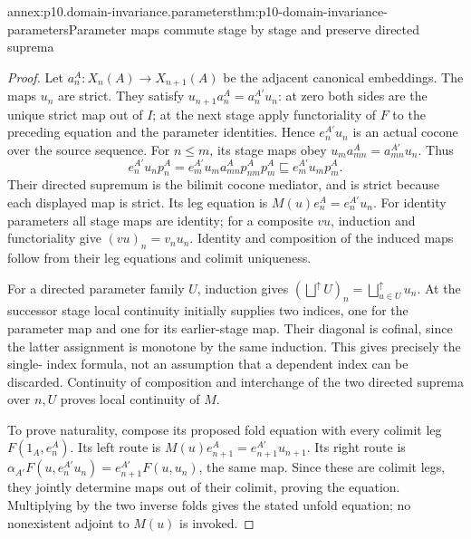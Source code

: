 \begin{annexitem}{annex:p10.domain-invariance.parameters}{thm:p10-domain-invariance-parameters}{Parameter maps commute stage by stage and preserve directed suprema}
\begin{proof}
Let \(a_n^A:X_n(A)\to X_{n+1}(A)\) be the adjacent
canonical embeddings. The maps \(u_n\) are strict. They satisfy
\(u_{n+1}a_n^A=a_n^{A'}u_n\): at zero both sides are
the unique strict map out of \(I\); at the next stage apply
functoriality of \(F\) to the preceding equation and the
parameter identities. Hence \(e_n^{A'}u_n\) is an actual
cocone over the source sequence.
For \(n\le m\), its stage maps obey
\(u_ma_{mn}^A=a_{mn}^{A'}u_n\). Thus
\[
 e_n^{A'}u_np_n^A
 =e_m^{A'}u_ma_{mn}^Ap_{nm}^Ap_m^A
                   \sqsubseteq e_m^{A'}u_mp_m^A.
\]
Their directed supremum is the bilimit cocone mediator, and is
strict because each displayed map is strict. Its leg equation is
\(M(u)e_n^A=e_n^{A'}u_n\).
For identity parameters all stage maps are identity; for a
composite \(vu\), induction and functoriality give
\((vu)_n=v_nu_n\). Identity and composition of the induced
maps follow from their leg equations and colimit uniqueness.

For a directed parameter family \(U\), induction gives
\((\bigsqcup^{\uparrow}U)_n=\bigsqcup_{u\in U}^{\uparrow}u_n\).
At the successor stage local continuity initially supplies two
indices, one for the parameter map and one for its earlier-stage
map. Their diagonal is cofinal, since the latter assignment is
monotone by the same induction. This gives precisely the single-
index formula, not an assumption that a dependent index can be
discarded. Continuity of composition and interchange of the two
directed suprema over \(n,U\) proves local continuity of \(M\).

To prove naturality, compose its proposed fold equation with
every colimit leg \(F(1_A,e_n^A)\). Its left route is
\(M(u)e_{n+1}^A=e_{n+1}^{A'}u_{n+1}\).
Its right route is
\(\alpha_{A'}F(u,e_n^{A'}u_n)
=e_{n+1}^{A'}F(u,u_n)\), the same map. Since these are
colimit legs, they jointly determine maps out of their colimit,
proving the equation. Multiplying by the two inverse folds gives
the stated unfold equation; no nonexistent adjoint to \(M(u)\)
is invoked.
\end{proof}
\end{annexitem}

